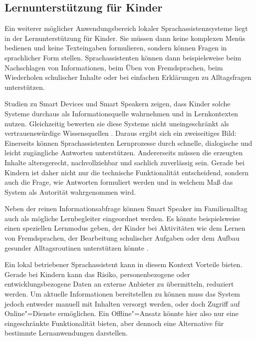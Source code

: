 \subsection{Lernunterstützung für Kinder}
\label{subsec:Lernunterstuetzung_fuer_Kinder}
Ein weiterer möglicher Anwendungsbereich lokaler Sprachassistenzsysteme liegt in der Lernunterstützung für Kinder. Sie müssen dann keine komplexen Menüs bedienen und keine Texteingaben formulieren, sondern können Fragen in sprachlicher Form stellen. Sprachassistenten können dann beispielsweise beim Nachschlagen von Informationen, beim Üben von Fremdsprachen, beim Wiederholen schulischer Inhalte oder bei einfachen Erklärungen zu Alltagsfragen unterstützen.

Studien zu Smart Devices und Smart Speakern zeigen, dass Kinder solche Systeme durchaus als Informationsquelle wahrnehmen und in Lernkontexten nutzen. Gleichzeitig bewerten sie diese Systeme nicht uneingeschränkt als vertrauenswürdige Wissensquellen \autocite{childrenLearnSmartDevices}. Daraus ergibt sich ein zweiseitiges Bild: Einerseits können Sprachassistenten Lernprozesse durch schnelle, dialogische und leicht zugängliche Antworten unterstützen. Andererseits müssen die erzeugten Inhalte altersgerecht, nachvollziehbar und sachlich zuverlässig sein. Gerade bei Kindern ist daher nicht nur die technische Funktionalität entscheidend, sondern auch die Frage, wie Antworten formuliert werden und in welchem Maß das System als Autorität wahrgenommen wird.

Neben der reinen Informationsabfrage können Smart Speaker im Familienalltag auch als mögliche Lernbegleiter eingeordnet werden. Es könnte beispielsweise einen speziellen Lernmodus geben, der Kinder bei Aktivitäten wie dem Lernen von Fremdsprachen, der Bearbeitung schulischer Aufgaben oder dem Aufbau gesunder Alltagsroutinen unterstützen könnte \autocite{voiceAssistantsEducation}.

Ein lokal betriebener Sprachassistent kann in diesem Kontext Vorteile bieten. Gerade bei Kindern kann das Risiko, personenbezogene oder entwicklungsbezogene Daten an externe Anbieter zu übermitteln, reduziert werden. Um aktuelle Informationen bereitstellen zu können muss das System jedoch entweder manuell mit Inhalten versorgt werden, oder doch Zugriff auf Online"=Dienste ermöglichen. Ein Offline"=Ansatz könnte hier also nur eine eingeschränkte Funktionalität bieten, aber dennoch eine Alternative für bestimmte Lernanwendungen darstellen.


